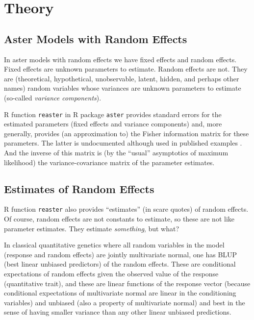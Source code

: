 \documentclass[11pt]{article}
\let\code=\texttt
\begin{document}
\section{Theory}

\subsection{Aster Models with Random Effects}

In aster models with random effects \citep*{reaster} we have fixed effects
and random effects.  Fixed effects are unknown parameters to estimate.
Random effects are not.  They are (theoretical, hypothetical, unobservable,
latent, hidden, and perhaps other names) random variables whose variances are
unknown parameters to estimate (so-called \emph{variance components}).

R function \code{reaster} in R package \code{aster} \citep{aster-package}
provides standard errors for the estimated parameters (fixed effects and
variance components) and, more generally, provides (an approximation to)
the Fisher information matrix for these parameters.  The latter is
undocumented although used in published examples
\citep[Supplementary material Section~12.3.1]{zenodo}.  And the inverse
of this matrix is (by the ``usual'' asymptotics of maximum likelihood)
the variance-covariance matrix of the parameter estimates.

\subsection{Estimates of Random Effects}

R function \code{reaster} also provides ``estimates'' (in scare quotes)
of random effects.  Of course, random effects are not constants to estimate,
so these are not like parameter estimates.  They estimate \emph{something}, but
what?

In classical quantitative genetics where all random variables in the model
(response and random effects) are jointly multivariate normal, one has
BLUP (best linear unbiased predictors) of the random effects.  These
are conditional expectations of random effects given the observed value
of the response (quantitative trait), and these are linear functions
of the response vector (because conditional expectations of multivariate
normal are linear in the conditioning variables) and unbiased
(also a property of multivariate normal)
and best in the sense of having smaller variance than any other linear
unbiased predictions.
\end{document}

